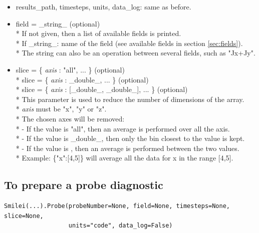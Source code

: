 \documentclass[11pt]{article}
\newcommand{\code}[1]{\colorbox{yellow!15}{\ttfamily #1}}
\newcommand{\val}[1]{{\ttfamily \textit{#1}}}
\begin{document}
\begin{itemize}
\item \code{results\_path}, \code{timesteps}, \code{units}, \code{data\_log}: same as before.
\item \code{field} = \code{\_string\_} (optional)\\*
	If not given, then a list of available fields is printed.\\*
	If \code{\_string\_}: name of the field (see available fields in section \ref{sec:fields}).\\*
	The string can also be an operation between several fields, such as \code{"Jx+Jy"}.
\item \code{slice} = \code{\{ \val{axis} : "all", ... \}}                 (optional)\\*
	\code{slice} = \code{\{ \val{axis} : \_double\_, ... \}}              (optional)\\*
	\code{slice} = \code{\{ \val{axis} : [\_double\_, \_double\_], ... \}}  (optional)\\*
	This parameter is used to reduce the number of dimensions of the array.\\*
	\val{axis} must be \code{"x"}, \code{"y"} or \code{"z"}.\\*
	 The chosen axes will be removed:\\*
	- If the value is \code{"all"}, then an average is performed over all the axis.\\*
	- If the value is \code{\_double\_}, then only the bin closest to the value is kept.\\*
	- If the value is \code{[\_double\_,\_double\_]}, then an average is performed between the two values.\\*
	Example: \code{\{"x":[4,5]\}} will average all the data for x in the range [4,5].
\end{itemize}
\vspace{0.5cm}


\subsection{To prepare a probe diagnostic}

\begin{lstlisting}
Smilei(...).Probe(probeNumber=None, field=None, timesteps=None, slice=None,
                  units="code", data_log=False)
\end{lstlisting}
\end{document}
